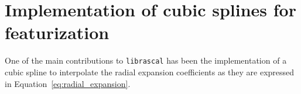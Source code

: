 \section{Implementation of cubic splines for featurization}
\label{sec:cubic_spline}
One of the main contributions to \texttt{librascal} has been the implementation of a cubic spline to interpolate the radial expansion coefficients as they are expressed in Equation~\eqref{eq:radial_expansion}.
